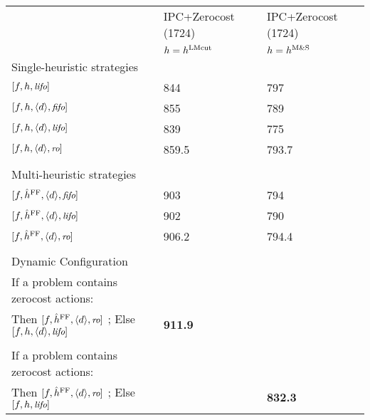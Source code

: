 \begin{center}
\begin{tabular}{|l|l|l|}
\hline
 & IPC+Zerocost (1724) & IPC+Zerocost (1724)\\
 & $h=\text{$h^\text{LMcut}$}$ & $h=\text{$h^\text{M\&S}$}$\\
Single-heuristic strategies &  & \\
$[f,h,{\small\textit{lifo}}]$ & 844 & 797\\
$[f,h,{\left<d\right>},{\small\textit{fifo}}]$ & 855 & 789\\
$[f,h,{\left<d\right>},{\small\textit{lifo}}]$ & 839 & 775\\
$[f,h,{\left<d\right>},{\small\textit{ro}}]$ & 859.5 & 793.7\\
 &  & \\
Multi-heuristic strategies &  & \\
$[f,{\hat{h}^{\text{FF}}},{\left<d\right>},{\small\textit{fifo}}]$ & 903 & 794\\
$[f,{\hat{h}^{\text{FF}}},{\left<d\right>},{\small\textit{lifo}}]$ & 902 & 790\\
$[f,{\hat{h}^{\text{FF}}},{\left<d\right>},{\small\textit{ro}}]$ & 906.2 & 794.4\\
 &  & \\
Dynamic Configuration &  & \\
If a problem contains zerocost actions: &  & \\
Then $[f,{\hat{h}^{\text{FF}}},{\left<d\right>},{\small\textit{ro}}]$ ; Else $[f,h,{\left<d\right>},{\small\textit{lifo}}]$ & \textbf{911.9} & \\
 &  & \\
If a problem contains zerocost actions: &  & \\
Then $[f,{\hat{h}^{\text{FF}}},{\left<d\right>},{\small\textit{ro}}]$ ; Else $[f,h,{\small\textit{lifo}}]$ &  & \textbf{832.3}\\
\hline
\end{tabular}
\end{center}
